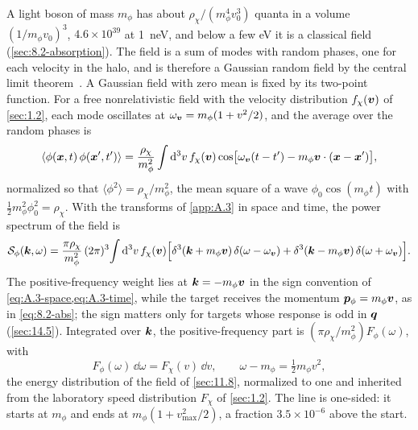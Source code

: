 A light boson of mass $m_\phi$ has about $\rho_\chi/(m_\phi^4v_0^3)$ quanta in a volume $(1/m_\phi v_0)^3$, $4.6\times10^{39}$ at \SI{1}{neV}, and below a few eV it is a classical field (\cref{sec:8.2-absorption}). The field is a sum of modes with random phases, one for each velocity in the halo, and is therefore a Gaussian random field by the central limit theorem~\cite[Eqs.~(3)--(10)]{foster2018revealing}. A Gaussian field with zero mean is fixed by its two-point function. For a free nonrelativistic field with the velocity distribution $f_\chi(\bm{v})$ of \cref{sec:1.2}, each mode oscillates at $\omega_{\bm{v}} = m_\phi(1 + v^2/2)$, and the average over the random phases is
\begin{equation*}
  \langle\phi(\bm{x},t)\,\phi(\bm{x}',t')\rangle = \frac{\rho_\chi}{m_\phi^2}\int\mathrm{d}^3v\,f_\chi(\bm{v})\cos\bigl[\omega_{\bm{v}}(t - t') - m_\phi\bm{v}\cdot(\bm{x} - \bm{x}')\bigr] ,
\end{equation*}
normalized so that $\langle\phi^2\rangle = \rho_\chi/m_\phi^2$, the mean square of a wave $\phi_0\cos(m_\phi t)$ with $\tfrac12m_\phi^2\phi_0^2 = \rho_\chi$. With the transforms of \cref{app:A.3} in space and time, the power spectrum of the field is
\begin{equation}
  \mathcal{S}_\phi(\bm{k},\omega) = \frac{\pi\rho_\chi}{m_\phi^2}\,(2\pi)^3\!\int\mathrm{d}^3v\,f_\chi(\bm{v})\Bigl[\delta^3(\bm{k} + m_\phi\bm{v})\,\delta(\omega - \omega_{\bm{v}}) + \delta^3(\bm{k} - m_\phi\bm{v})\,\delta(\omega + \omega_{\bm{v}})\Bigr] .
  \label{eq:14.6-Sphi}
\end{equation}
The positive-frequency weight lies at $\bm{k} = -m_\phi\bm{v}$ in the sign convention of \cref{eq:A.3-space,eq:A.3-time}, while the target receives the momentum $\bm{p}_\phi = m_\phi\bm{v}$, as in \cref{eq:8.2-abs}; the sign matters only for targets whose response is odd in $\bm{q}$ (\cref{sec:14.5}). Integrated over $\bm{k}$, the positive-frequency part is $(\pi\rho_\chi/m_\phi^2)F_\phi(\omega)$, with
\begin{equation}
  F_\phi(\omega)\,\dd\omega = F_\chi(v)\,\dd v, \qquad \omega - m_\phi = \tfrac12m_\phi v^2 ,
  \label{eq:14.6-Fphi}
\end{equation}
the energy distribution of the field of \cref{sec:11.8}, normalized to one and inherited from the laboratory speed distribution $F_\chi$ of \cref{sec:1.2}. The line is one-sided: it starts at $m_\phi$ and ends at $m_\phi(1 + v_{\mathrm{max}}^2/2)$, a fraction $3.5\times10^{-6}$ above the start.

